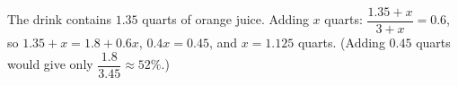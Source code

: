 The drink contains $1.35$ quarts of orange juice. Adding $x$ quarts: $\dfrac{1.35+x}{3+x}=0.6$, so $1.35+x=1.8+0.6x$, $0.4x=0.45$, and $x=\boxed{1.125}$ quarts. (Adding $0.45$ quarts would give only $\dfrac{1.8}{3.45}\approx52\%$.)
